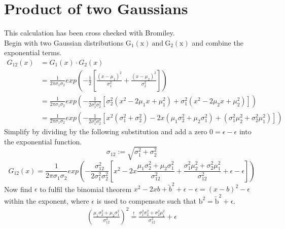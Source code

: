 \documentclass[twoside,openright]{scrreprt}
\begin{document}
{\section{Product of two Gaussians}\label{deriv:GaussiansDerivation}
This calculation has been cross checked with Bromiley.\cite{Bromiley2014}\\
Begin with two Gaussian distributions $\mathrm{G_1(x)\ and \ G_2(x)}$ and combine the exponential terms.
\begin{equation*}
\begin{split}
G_{12}(x) & =  G_1(x) \cdot G_2(x) \\ 
& = \frac{1}{2\pi \sigma_1 \sigma_2}
exp\left(-\frac{1}{2}\left[\frac{\left(x-\mu_1\right)^2}{\sigma_1^2} + \frac{\left(x-\mu_2\right)^2}{\sigma_2^2} \right]\right)
\\
& = \frac{1}{2\pi \sigma_1 \sigma_2} exp \left(-\frac{1}{2\sigma_1^2 \sigma_2^2} \left[
\sigma_2^2 \left(x^2 - 2 \mu_1 x + \mu_1^2 \right) + 
\sigma_1^2 \left(x^2 - 2 \mu_2 x + \mu_2^2 \right)
\right] \right)
\\
& = \frac{1}{2\pi \sigma_1 \sigma_2} exp \left(-\frac{1}{2\sigma_1^2 \sigma_2^2} \left[
x^2(\sigma_1^2+\sigma_2^2) - 2x(\mu_1\sigma_2^2 + \mu_2\sigma_1^2) + (\sigma_1^2 \mu_2^2 + \sigma_2^2 \mu_1^2)
\right] \right)
\end{split}
\end{equation*}
Simplify by dividing by the following substitution and add a zero $0 = \epsilon - \epsilon$ into the exponential function.
\begin{equation*}
\sigma_{12} := \sqrt{\sigma_1^2+\sigma_2^2}
\end{equation*}
\begin{equation*}
G_{12}(x) = \frac{1}{2\pi \sigma_1 \sigma_2} exp \left(-\frac{\sigma_{12}^2}{2\sigma_1^2\sigma_2^2}\left[
x^2 - 2x\frac{\mu_1\sigma_2^2+ \mu_2\sigma_1^2}{\sigma_{12}^2} + \frac{\sigma_1^2\mu_2^2 + \sigma_2^2\mu_1^2}{\sigma_{12}^2}
+ \epsilon - \epsilon
\right]\right)
\end{equation*}
Now find $\epsilon$ to fulfil the binomial theorem $x^2- 2xb + \tilde{b}^2 + \epsilon - \epsilon= (x-b)^2 - \epsilon$ within the exponent, where $\epsilon$ is used to compensate such that $\mathrm{b^2 = \tilde{b}^2 + \epsilon}$.
\begin{gather*}
\left(\frac{\mu_1 \sigma_2^2 + \mu_2\sigma_1^2}{\sigma_{12}^2}\right)^2 \stackrel{!}{=} \frac{\sigma_1^2\sigma_2^2 + \sigma_2^2\mu_1^2}{\sigma_{12}^2} + \epsilon
\\
\begin{split}

\end{split}
\end{gather*}}
\end{document}

